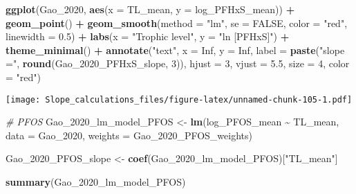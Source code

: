 \documentclass[
]{article}
\newenvironment{Shaded}{\begin{snugshade}}{\end{snugshade}}
\newcommand{\AttributeTok}[1]{\textcolor[rgb]{0.13,0.29,0.53}{#1}}
\newcommand{\CommentTok}[1]{\textcolor[rgb]{0.56,0.35,0.01}{\textit{#1}}}
\newcommand{\ConstantTok}[1]{\textcolor[rgb]{0.56,0.35,0.01}{#1}}
\newcommand{\DecValTok}[1]{\textcolor[rgb]{0.00,0.00,0.81}{#1}}
\newcommand{\FloatTok}[1]{\textcolor[rgb]{0.00,0.00,0.81}{#1}}
\newcommand{\FunctionTok}[1]{\textcolor[rgb]{0.13,0.29,0.53}{\textbf{#1}}}
\newcommand{\NormalTok}[1]{#1}
\newcommand{\OtherTok}[1]{\textcolor[rgb]{0.56,0.35,0.01}{#1}}
\newcommand{\SpecialCharTok}[1]{\textcolor[rgb]{0.81,0.36,0.00}{\textbf{#1}}}
\newcommand{\StringTok}[1]{\textcolor[rgb]{0.31,0.60,0.02}{#1}}
\begin{document}
\begin{Shaded}
\begin{Highlighting}[]
\FunctionTok{ggplot}\NormalTok{(Gao\_2020, }\FunctionTok{aes}\NormalTok{(}\AttributeTok{x =}\NormalTok{ TL\_mean, }\AttributeTok{y =}\NormalTok{ log\_PFHxS\_mean)) }\SpecialCharTok{+}
  \FunctionTok{geom\_point}\NormalTok{() }\SpecialCharTok{+}
  \FunctionTok{geom\_smooth}\NormalTok{(}\AttributeTok{method =} \StringTok{"lm"}\NormalTok{, }\AttributeTok{se =} \ConstantTok{FALSE}\NormalTok{, }\AttributeTok{color =} \StringTok{"red"}\NormalTok{, }\AttributeTok{linewidth =} \FloatTok{0.5}\NormalTok{) }\SpecialCharTok{+}
  \FunctionTok{labs}\NormalTok{(}\AttributeTok{x =} \StringTok{"Trophic level"}\NormalTok{,}
       \AttributeTok{y =} \StringTok{"ln [PFHxS]"}\NormalTok{) }\SpecialCharTok{+}
  \FunctionTok{theme\_minimal}\NormalTok{() }\SpecialCharTok{+}
  \FunctionTok{annotate}\NormalTok{(}\StringTok{"text"}\NormalTok{, }\AttributeTok{x =} \ConstantTok{Inf}\NormalTok{, }\AttributeTok{y =} \ConstantTok{Inf}\NormalTok{, }\AttributeTok{label =} \FunctionTok{paste}\NormalTok{(}\StringTok{"slope ="}\NormalTok{, }\FunctionTok{round}\NormalTok{(Gao\_2020\_PFHxS\_slope, }\DecValTok{3}\NormalTok{)), }
           \AttributeTok{hjust =} \DecValTok{3}\NormalTok{, }\AttributeTok{vjust =} \FloatTok{5.5}\NormalTok{, }\AttributeTok{size =} \DecValTok{4}\NormalTok{, }\AttributeTok{color =} \StringTok{"red"}\NormalTok{)}
\end{Highlighting}
\end{Shaded}

\texttt{[image: Slope\_calculations\_files/figure-latex/unnamed-chunk-105-1.pdf]}

\begin{Shaded}
\begin{Highlighting}[]
\CommentTok{\# PFOS}
\NormalTok{Gao\_2020\_lm\_model\_PFOS }\OtherTok{\textless{}{-}} \FunctionTok{lm}\NormalTok{(log\_PFOS\_mean }\SpecialCharTok{\textasciitilde{}}\NormalTok{ TL\_mean,}
                             \AttributeTok{data =}\NormalTok{ Gao\_2020,}
                             \AttributeTok{weights =}\NormalTok{ Gao\_2020\_PFOS\_weights)}

\NormalTok{Gao\_2020\_PFOS\_slope }\OtherTok{\textless{}{-}} \FunctionTok{coef}\NormalTok{(Gao\_2020\_lm\_model\_PFOS)[}\StringTok{"TL\_mean"}\NormalTok{]}

\FunctionTok{summary}\NormalTok{(Gao\_2020\_lm\_model\_PFOS)}
\end{Highlighting}
\end{Shaded}
\end{document}
